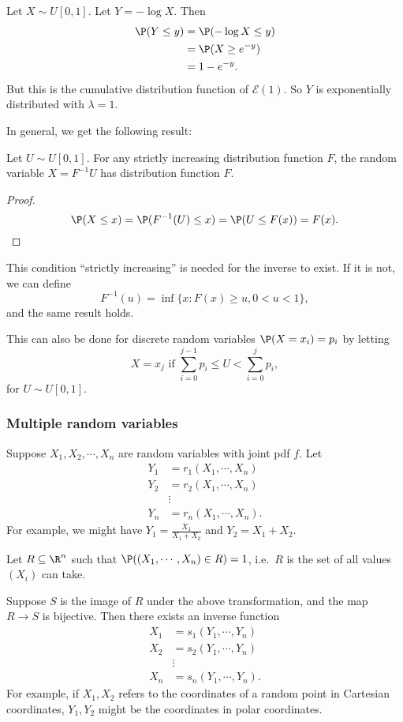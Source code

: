 \documentclass[a4paper]{article}
\begin{document}
\begin{eg}
  Let $X\sim U[0, 1]$. Let $Y = -\log X$. Then
  \begin{align*}
    \P(Y \leq y) &= \P(-\log X \leq y)\\
    &= \P(X \geq e^{-y})\\
    &= 1 - e^{-y}.
  \end{align*}
  But this is the cumulative distribution function of $\mathcal{E}(1)$. So $Y$ is exponentially distributed with $\lambda = 1$.
\end{eg}

In general, we get the following result:
\begin{thm}
  Let $U\sim U[0, 1]$. For any strictly increasing distribution function $F$, the random variable $X = F^{-1}U$ has distribution function $F$.
\end{thm}

\begin{proof}
  \[
    \P(X \leq x) = \P(F^{-1}(U) \leq x) = \P(U \leq F(x)) = F(x).
  \]
\end{proof}
This condition ``strictly increasing'' is needed for the inverse to exist. If it is not, we can define
\[
  F^{-1}(u) = \inf\{x: F(x)\geq u, 0 < u < 1\},
\]
and the same result holds.

This can also be done for discrete random variables $\P(X = x_i) = p_i$ by letting
\[
  X = x_j\text{ if }\sum_{i = 0}^{j - 1}p_i \leq U < \sum_{i = 0}^j p_i,
\]
for $U\sim U[0, 1]$.

\subsubsection*{Multiple random variables}
Suppose $X_1, X_2, \cdots, X_n$ are random variables with joint pdf $f$. Let
\begin{align*}
  Y_1 &= r_1(X_1, \cdots, X_n)\\
  Y_2 &= r_2(X_1, \cdots, X_n)\\
  &\vdots \\
  Y_n &= r_n(X_1, \cdots, X_n).
\end{align*}
For example, we might have $Y_1 = \frac{X_1}{X_1 + X_2}$ and $Y_2 = X_1 + X_2$.

Let $R\subseteq \R^n$ such that $\P((X_1, \cdots, X_n)\in R) = 1$, i.e.\ $R$ is the set of all values $(X_i)$ can take.

Suppose $S$ is the image of $R$ under the above transformation, and the map $R\to S$ is bijective. Then there exists an inverse function
\begin{align*}
  X_1 &= s_1(Y_1, \cdots, Y_n)\\
  X_2 &= s_2(Y_1, \cdots, Y_n)\\
  &\vdots\\
  X_n &= s_n(Y_1, \cdots, Y_n).
\end{align*}
For example, if $X_1, X_2$ refers to the coordinates of a random point in Cartesian coordinates, $Y_1, Y_2$ might be the coordinates in polar coordinates.
\end{document}
